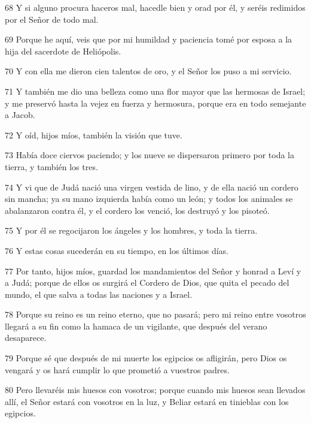 \par 68 Y si alguno procura haceros mal, hacedle bien y orad por él, y seréis redimidos por el Señor de todo mal.

\par 69 Porque he aquí, veis que por mi humildad y paciencia tomé por esposa a la hija del sacerdote de Heliópolis.

\par 70 Y con ella me dieron cien talentos de oro, y el Señor los puso a mi servicio.

\par 71 Y también me dio una belleza como una flor mayor que las hermosas de Israel; y me preservó hasta la vejez en fuerza y ​​hermosura, porque era en todo semejante a Jacob.

\par 72 Y oíd, hijos míos, también la visión que tuve.

\par 73 Había doce ciervos paciendo; y los nueve se dispersaron primero por toda la tierra, y también los tres.

\par 74 Y vi que de Judá nació una virgen vestida de lino, y de ella nació un cordero sin mancha; ya su mano izquierda había como un león; y todos los animales se abalanzaron contra él, y el cordero los venció, los destruyó y los pisoteó.

\par 75 Y por él se regocijaron los ángeles y los hombres, y toda la tierra.

\par 76 Y estas cosas sucederán en su tiempo, en los últimos días.

\par 77 Por tanto, hijos míos, guardad los mandamientos del Señor y honrad a Leví y a Judá; porque de ellos os surgirá el Cordero de Dios, que quita el pecado del mundo, el que salva a todas las naciones y a Israel.

\par 78 Porque su reino es un reino eterno, que no pasará; pero mi reino entre vosotros llegará a su fin como la hamaca de un vigilante, que después del verano desaparece.

\par 79 Porque sé que después de mi muerte los egipcios os afligirán, pero Dios os vengará y os hará cumplir lo que prometió a vuestros padres.

\par 80 Pero llevaréis mis huesos con vosotros; porque cuando mis huesos sean llevados allí, el Señor estará con vosotros en la luz, y Beliar estará en tinieblas con los egipcios.

